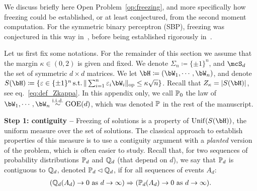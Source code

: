 We discuss briefly here Open Problem~\ref{op:freezing}, and more specifically how freezing could be established, 
or at least conjectured, from the second moment computation.
For the symmetric binary perceptron (SBP), freezing was conjectured in this way in~\cite{aubin2019storage}, before being established rigorously in~\cite{perkins2021frozen,abbe2022proof}.

\myskip 
Let us first fix some notations.
For the remainder of this section we assume that the margin $\kappa \in (0,2)$ is given and fixed.
We denote $\Sigma_n \coloneqq \{\pm 1\}^n$, and $\mcS_d$ the set of symmetric $d \times d$ matrices.
We let $\bH \coloneqq (\bW_1, \cdots, \bW_n)$, and denote $S(\bH) \coloneqq \{\eps \in \{\pm 1\}^n \, \textrm{s.t.} \, \|\sum_{i=1}^n \eps_i \bW_i\|_{\op} \leq \kappa \sqrt{n} \}$.
Recall that $Z_\kappa = |S(\bH)|$, see eq.~\eqref{eq:def_Zkappa}.
In this appendix only, we call $\mathbb{P}_0$ the law of $\bW_1, \cdots, \bW_n \iid \GOE(d)$, which was denoted $\mathbb{P}$ in the rest of the manuscript.

\myskip 
\textbf{Step 1: contiguity --}
Freezing of solutions is a property of $\Unif(S(\bH))$, the uniform measure over the set of solutions.
The classical approach to establish properties of this measure is to use a contiguity argument with a \emph{planted} version of the problem, 
which is often easier to study.
Recall that, for two sequences of probability distributions $\mathbb{P}_d$ and $\mathbb{Q}_d$ (that depend on $d$), we say that $\mathbb{P}_d$ is contiguous to $\mathbb{Q}_d$, denoted $\mathbb{P}_d \lhd \mathbb{Q}_d$, 
if for all sequences of events $A_d$:
\begin{align}\label{eq:contiguity}
(\mathbb{Q}_d(A_d) \to 0 \textrm{ as } d \to \infty)
 \Rightarrow 
(\mathbb{P}_d(A_d) \to 0 \textrm{ as } d \to \infty).
\end{align}


